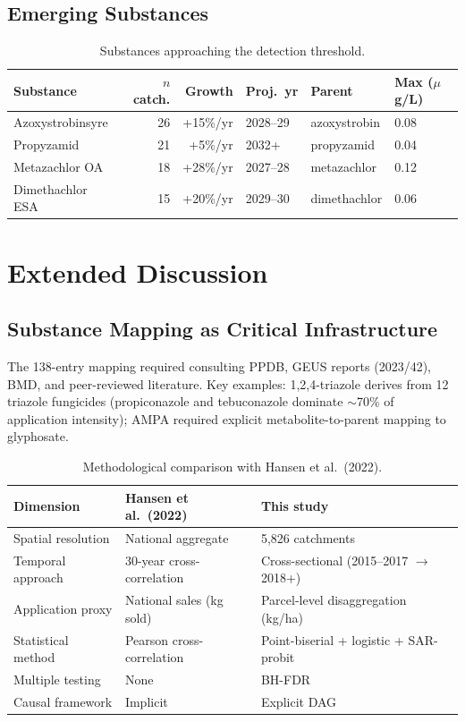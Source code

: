 \documentclass[12pt,a4paper]{article}
\begin{document}
\subsection{Emerging Substances}

\begin{table}[H]
\centering
\caption{Substances approaching the detection threshold.}
\scriptsize
\begin{tabular}{@{}lrrlll@{}}
\toprule
Substance & $n$ catch. & Growth & Proj.\ yr & Parent & Max ($\mu$g/L) \\
\midrule
Azoxystrobinsyre & 26 & +15\%/yr & 2028--29 & azoxystrobin & 0.08 \\
Propyzamid & 21 & +5\%/yr & 2032+ & propyzamid & 0.04 \\
Metazachlor OA & 18 & +28\%/yr & 2027--28 & metazachlor & 0.12 \\
Dimethachlor ESA & 15 & +20\%/yr & 2029--30 & dimethachlor & 0.06 \\
\bottomrule
\end{tabular}
\end{table}

\section{Extended Discussion}

\subsection{Substance Mapping as Critical Infrastructure}

The 138-entry mapping required consulting PPDB, GEUS reports (2023/42), BMD, and peer-reviewed literature. Key examples: 1,2,4-triazole derives from 12 triazole fungicides (propiconazole and tebuconazole dominate $\sim$70\% of application intensity); AMPA required explicit metabolite-to-parent mapping to glyphosate.

\begin{table}[H]
\centering
\caption{Methodological comparison with Hansen et al.\ (2022).}
\begin{tabular}{@{}lll@{}}
\toprule
Dimension & Hansen et al.\ (2022) & This study \\
\midrule
Spatial resolution & National aggregate & 5,826 catchments \\
Temporal approach & 30-year cross-correlation & Cross-sectional (2015--2017 $\to$ 2018+) \\
Application proxy & National sales (kg sold) & Parcel-level disaggregation (kg/ha) \\
Statistical method & Pearson cross-correlation & Point-biserial + logistic + SAR-probit \\
Multiple testing & None & BH-FDR \\
Causal framework & Implicit & Explicit DAG \\
\bottomrule
\end{tabular}
\end{table}
\end{document}
